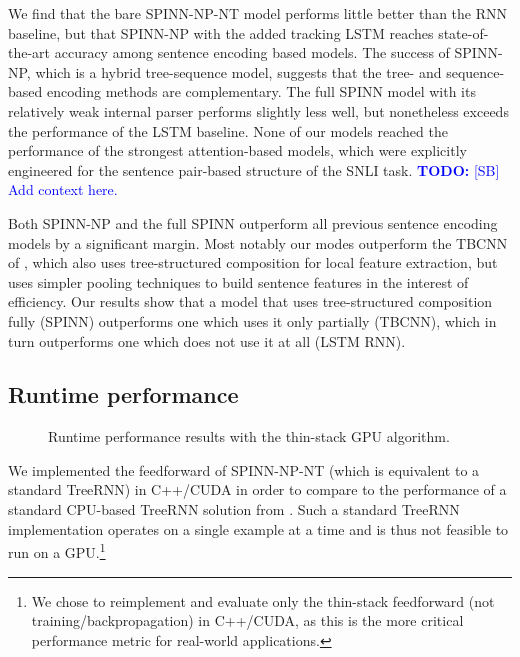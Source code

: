 \documentclass[11pt]{article}
\newcommand\todo[1]{\textcolor{blue}{\textbf{TODO:} #1}}
\begin{document}
We find that the bare SPINN-NP-NT model performs little better than the RNN baseline, but that SPINN-NP with the added tracking LSTM reaches state-of-the-art accuracy among sentence encoding based models. The success of SPINN-NP, which is a hybrid tree-sequence model, suggests that the tree- and sequence-based encoding methods are complementary. The full SPINN model with its relatively weak internal parser performs slightly less well, but nonetheless exceeds the performance of the LSTM baseline. None of our models reached the performance of the strongest attention-based models, which were explicitly engineered for the sentence pair-based structure of the SNLI task. \todo{[SB] Add context here.}

Both SPINN-NP and the full SPINN outperform all previous sentence encoding models by a significant margin. Most notably our modes outperform the TBCNN of \citet{mou2015recognizing}, which also uses tree-structured composition for local feature extraction, but uses simpler pooling techniques to build sentence features in the interest of efficiency. Our results show that a model that uses tree-structured composition fully (SPINN) outperforms one which uses it only partially (TBCNN), which in turn outperforms one which does not use it at all (LSTM RNN).

\subsection{Runtime performance}
\label{sec:speed}

\begin{figure}
\caption{Runtime performance results with the thin-stack GPU algorithm.}
\label{fig:speed}
\end{figure}

We implemented the feedforward of SPINN-NP-NT (which is equivalent to a standard TreeRNN) in C++/CUDA in order to compare to the performance of a standard CPU-based TreeRNN solution from \citet{irsoy2014deep}. Such a standard TreeRNN implementation operates on a single example at a time and is thus not feasible to run on a GPU.\footnote{We chose to reimplement and evaluate only the thin-stack feedforward (not training/backpropagation) in C++/CUDA, as this is the more critical performance metric for real-world applications.}
\end{document}
